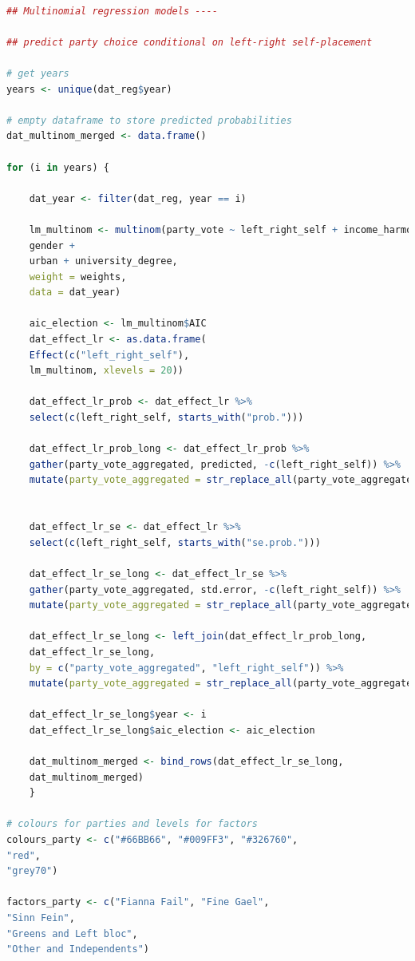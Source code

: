 \documentclass[12pt,letterpaper]{article}
\begin{document}
\begin{lstlisting}[language=R]

## Multinomial regression models ----

## predict party choice conditional on left-right self-placement

# get years
years <- unique(dat_reg$year)

# empty dataframe to store predicted probabilities
dat_multinom_merged <- data.frame()

for (i in years) {
	
	dat_year <- filter(dat_reg, year == i)
	
	lm_multinom <- multinom(party_vote ~ left_right_self + income_harmonised + age_cat  + 
	gender + 
	urban + university_degree,
	weight = weights,
	data = dat_year)
	
	aic_election <- lm_multinom$AIC
	dat_effect_lr <- as.data.frame(
	Effect(c("left_right_self"), 
	lm_multinom, xlevels = 20))
	
	dat_effect_lr_prob <- dat_effect_lr %>% 
	select(c(left_right_self, starts_with("prob.")))
	
	dat_effect_lr_prob_long <- dat_effect_lr_prob %>% 
	gather(party_vote_aggregated, predicted, -c(left_right_self)) %>% 
	mutate(party_vote_aggregated = str_replace_all(party_vote_aggregated, "prob.", ""))
	
	
	dat_effect_lr_se <- dat_effect_lr %>% 
	select(c(left_right_self, starts_with("se.prob.")))
	
	dat_effect_lr_se_long <- dat_effect_lr_se %>% 
	gather(party_vote_aggregated, std.error, -c(left_right_self)) %>% 
	mutate(party_vote_aggregated = str_replace_all(party_vote_aggregated, "se.prob.", ""))
	
	dat_effect_lr_se_long <- left_join(dat_effect_lr_prob_long,
	dat_effect_lr_se_long,
	by = c("party_vote_aggregated", "left_right_self")) %>% 
	mutate(party_vote_aggregated = str_replace_all(party_vote_aggregated, "\\.", " ")) 
	
	dat_effect_lr_se_long$year <- i
	dat_effect_lr_se_long$aic_election <- aic_election
	
	dat_multinom_merged <- bind_rows(dat_effect_lr_se_long,
	dat_multinom_merged)
	}

# colours for parties and levels for factors
colours_party <- c("#66BB66", "#009FF3", "#326760",
"red",
"grey70")

factors_party <- c("Fianna Fail", "Fine Gael",
"Sinn Fein",
"Greens and Left bloc",
"Other and Independents")


\end{lstlisting}
\end{document}
